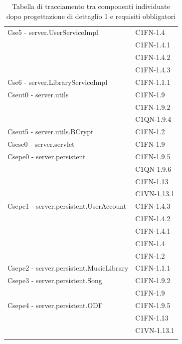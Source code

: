 \begin{footnotesize}
\begin{longtable}[!h]{|l|l|}
Cse5 - server.UserServiceImpl & C1FN-1.4 \\
& C1FN-1.4.1 \\
& C1FN-1.4.2 \\
& C1FN-1.4.3 \\\hline
Cse6 - server.LibraryServiceImpl & C1FN-1.1.1 \\\hline
Cseut0 - server.utils & C1FN-1.9 \\
& C1FN-1.9.2 \\
& C1QN-1.9.4 \\\hline
Cseut5 - server.utils.BCrypt & C1FN-1.2 \\\hline
Csese0 - server.servlet & C1FN-1.9 \\\hline
Csepe0 - server.persistent & C1FN-1.9.5 \\
& C1QN-1.9.6 \\
& C1FN-1.13 \\
& C1VN-1.13.1 \\\hline
Csepe1 - server.persistent.UserAccount & C1FN-1.4.3 \\
& C1FN-1.4.2 \\
& C1FN-1.4.1 \\
& C1FN-1.4 \\
& C1FN-1.2 \\\hline
Csepe2 - server.persistent.MusicLibrary &  C1FN-1.1.1 \\\hline
Csepe3 - server.persistent.Song & C1FN-1.9.2 \\
& C1FN-1.9 \\\hline
Csepe4 - server.persistent.ODF & C1FN-1.9.5 \\
& C1FN-1.13 \\
& C1VN-1.13.1 \\\hline
\caption{Tabella di tracciamento tra componenti individuate dopo
progettazione di dettaglio 1 e requisiti obbligatori}
\end{longtable}
\end{footnotesize}

